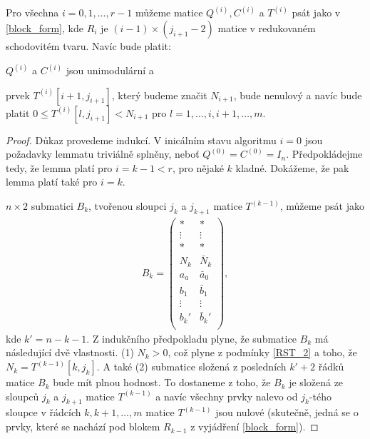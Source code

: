 \begin{lem} \label{RST_algo_lemma}
Pro všechna $ i = 0, 1, \dots, r - 1 $ můžeme matice $ Q^{(i)}, C^{(i)} $ a  $ T^{(i)} $
psát jako v \ref{block_form}, kde $ R_i $ je $ (i - 1) \times (j_{i + 1} - 2) $
matice v redukovaném schodovitém tvaru. Navíc bude platit:
\begin{Cond}
    \item $ Q^{(i)} $ a $ C^{(i)} $ jsou unimodulární a
    \item \label{RST_2} prvek $ T^{(i)}[i+1, j_{i+1}] $, který budeme značit $ N_{i + 1} $, bude
    nenulový a navíc bude platit $ 0 \leq T^{(i)}[l, j_{i+1}] < N_{i+1} $ pro
    $ l = 1, \dots, i, i+1, \dots, m $.
\end{Cond}
\end{lem}
\begin{proof}
Důkaz provedeme indukcí. V inicálním stavu algoritmu $ i = 0 $ jsou požadavky lemmatu
triviálně splněny, neboť $ Q^{(0)} = C^{(0)} = I_n $. Předpokládejme tedy, že
lemma platí pro $ i = k - 1 < r $, pro nějaké $ k $ kladné.
Dokážeme, že pak lemma platí také pro $ i = k $.

$ n \times 2 $ submatici $ B_k $, tvořenou sloupci $ j_k $ a $ j_{k+1} $ matice
$ T^{(k-1)} $, můžeme psát jako
\begin{align*}
B_k =
    \begin{pmatrix}
        \ast   & \ast   \\
        \vdots & \vdots \\
        \ast   & \ast   \\
        N_k    & \bar{N}_k \\
        a_a    & \bar{a}_0  \\
        b_1    & \bar{b}_1  \\
        \vdots & \vdots  \\
        b_k'    & \bar{b}_k'  \\
    \end{pmatrix},
\end{align*}
kde $ k' = n - k - 1 $. Z indukčního předpokladu plyne, že submatice $ B_k $ má
následující dvě vlastnosti.
(1) $ N_k > 0 $, což plyne z podmínky \ref{RST_2} a toho, že $ N_k = T^{(k - 1)}[k, j_k] $.
A také (2) submatice složená z posledních $ k' + 2 $ řádků matice $ B_k $
bude mít plnou hodnost. To dostaneme z toho, že $ B_k $ je složená ze sloupců
$ j_k $ a $ j_{k+1} $ matice $ T^{(k - 1)} $ a navíc všechny prvky nalevo od
$ j_k $-tého sloupce v řádcích $k, k+1, \dots, m $ matice $ T^{(k - 1)} $ jsou nulové
(skutečně, jedná se o prvky, které se nachází pod blokem $ R_{k-1} $ z vyjádření
\ref{block_form}).


\end{proof}
